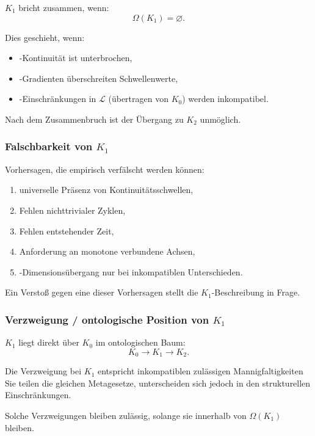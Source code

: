 $K_1$ bricht zusammen, wenn:
\[
\Omega(K_1) = \varnothing.
\]

Dies geschieht, wenn:
\begin{itemize}
    Die \item-Kontinuität ist unterbrochen,
    \item-Gradienten überschreiten Schwellenwerte,
    \item-Einschränkungen in $\mathcal{L}$ (übertragen von $K_0$) werden
          inkompatibel.
\end{itemize}

Nach dem Zusammenbruch ist der Übergang zu $K_2$ unmöglich.

\subsubsection{Falschbarkeit von \texorpdfstring{$K_1$}{K_1}}

Vorhersagen, die empirisch verfälscht werden können:
\begin{enumerate}
    \item universelle Präsenz von Kontinuitätsschwellen,
    \item Fehlen nichttrivialer Zyklen,
    \item Fehlen entstehender Zeit,
    \item Anforderung an monotone verbundene Achsen,
    \item-Dimensionsübergang nur bei inkompatiblen Unterschieden.
\end{enumerate}

Ein Verstoß gegen eine dieser Vorhersagen stellt die $K_1$-Beschreibung in Frage.

\subsubsection{Verzweigung / ontologische Position von \texorpdfstring{$K_1$}{K_1}}

$K_1$ liegt direkt über $K_0$ im ontologischen Baum:
\[
K_0 \to K_1 \to K_2.
\]

Die Verzweigung bei $K_1$ entspricht inkompatiblen zulässigen Mannigfaltigkeiten
Sie teilen die gleichen Metagesetze, unterscheiden sich jedoch in den strukturellen Einschränkungen.

Solche Verzweigungen bleiben zulässig, solange sie innerhalb von $\Omega(K_1)$ bleiben.

